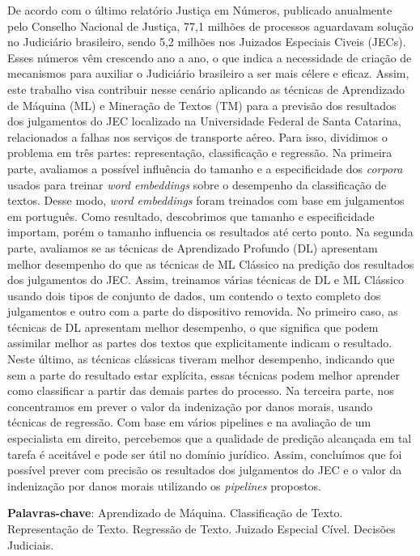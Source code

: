 \setlength{\absparsep}{18pt} %
\begin{resumo}[Resumo]
\SingleSpacing
De acordo com o último relatório Justiça em Números, publicado anualmente pelo Conselho Nacional de Justiça, 77,1 milhões de processos aguardavam solução no Judiciário brasileiro, sendo 5,2 milhões nos Juizados Especiais Civeis (JECs). Esses números vêm crescendo ano a ano, o que indica a necessidade de criação de mecanismos para auxiliar o Judiciário brasileiro a ser mais célere e eficaz. Assim, este trabalho visa contribuir nesse cenário aplicando as técnicas de Aprendizado de Máquina (ML) e Mineração de Textos (TM) para a previsão dos resultados dos julgamentos do JEC localizado na Universidade Federal de Santa Catarina, relacionados  a falhas nos serviços de transporte aéreo. Para isso, dividimos o problema em três partes: representação, classificação e regressão. Na primeira parte,  avaliamos a possível influência do tamanho e a especificidade dos \textit{corpora} usados para treinar \textit{word embeddings} sobre o desempenho da classificação de textos. Desse modo, \textit{word embeddings} foram treinados com base em julgamentos em português. Como resultado, descobrimos que tamanho e especificidade importam, porém o tamanho influencia os resultados até certo ponto. Na segunda parte, avaliamos se as técnicas de Aprendizado Profundo (DL) apresentam melhor desempenho do que as técnicas de ML Clássico na predição dos resultados dos julgamentos do JEC. Assim, treinamos várias técnicas de DL e ML Clássico usando dois tipos de conjunto de dados, um contendo o texto completo dos julgamentos e outro com a parte do dispositivo removida. No primeiro caso, as técnicas de DL apresentam melhor desempenho, o que significa que podem assimilar melhor as partes dos textos que explicitamente indicam o resultado. Neste último, as técnicas clássicas tiveram melhor desempenho, indicando que sem a parte do resultado estar explícita, essas técnicas podem melhor aprender como classificar a partir das demais partes do processo. Na terceira parte, nos concentramos em prever o valor da indenização por danos morais, usando técnicas de regressão. Com base em vários pipelines e na avaliação de um especialista em direito, percebemos que a qualidade de predição alcançada em tal tarefa é aceitável e pode ser útil no domínio jurídico. Assim, concluímos que foi possível prever com precisão os resultados dos julgamentos do JEC e o valor da indenização por danos morais utilizando os \textit{pipelines} propostos. 

\textbf{\textsf{Palavras-chave}}: Aprendizado de Máquina. Classificação de Texto. Representação de Texto. Regressão de Texto. Juizado Especial Cível. Decisões Judiciais.
\end{resumo}


